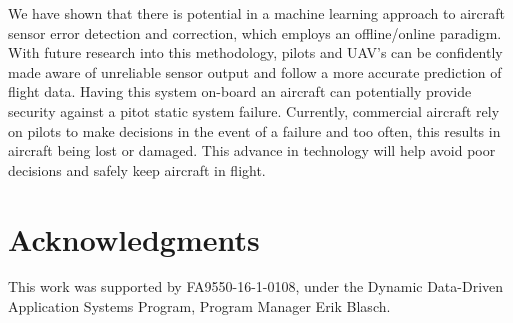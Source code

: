 \documentclass[]{aiaa-tc}
\begin{document}
We have shown that there is potential in a machine learning approach to aircraft sensor error detection and correction, which employs an offline/online paradigm. With future research into this methodology, pilots and UAV's can be confidently made aware of unreliable sensor output and follow a more accurate prediction of flight data. Having this system on-board an aircraft can potentially provide security against a pitot static system failure. Currently, commercial aircraft rely on pilots to make decisions in the event of a failure and too often, this results in aircraft being lost or damaged. This advance in technology will help avoid poor decisions and safely keep aircraft in flight. 


\section*{Acknowledgments}

This work was supported by FA9550-16-1-0108, under the Dynamic Data-Driven Application Systems Program, Program Manager Erik Blasch.
\newpage



 

\end{document}
